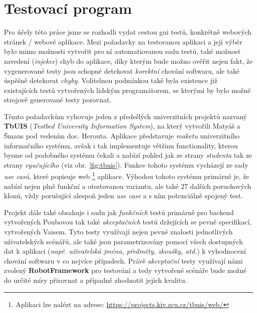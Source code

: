 \documentclass[czech, ma, kiv, he, iso690alph, pdf, viewonly]{fasthesis}
\begin{document}
    \section{Testovací program} \label{sec:test_program}

    Pro účely této práce jsme se rozhodli vydat cestou \acrshort{gui} testů, konkrétně webových stránek / webové aplikace. Mezi požadavky na testovanou aplikaci a její výběr bylo mimo možnosti vytvořit pro ní automatiovanou sadu testů, také možnost zavedení (\emph{injekce}) chyb do aplikace, díky kterým bude možno ověřit nejen fakt, že vygenerované testy jsou schopné detekovat \textit{korektní} chování softwaru, ale také úspěšně detekovat \textit{chyby}. Volitelnou podmínkou také byla existence již existujících testů vytvořených lidským programátorem, se kterými by bylo možné strojově generované testy porovnat.
    
    Těmto požadavkům vyhovuje jeden z předešlých univerzitních projektů nazvaný \textbf{TbUIS} (\textit{Testbed University Information System}), na který vytvořili Matyáš a Šmaus pod vedením doc. Herouta. \cite{Matyas2018} \cite{Smaus2019} Aplikace představuje \textit{maketu} univerzitního informačního systému, avšak i tak implementuje většinu functionality, kterou bysme od podobného systému čekali a nabízí pohled jak ze strany \textit{studenta} tak ze strany \textit{vyučujícího} (viz obr. \ref{fig:tbuis}). Funkce tohoto systému vycházejí ze sady \textit{use casů}, které popisuje web \footnote{Aplikaci lze nalézt na adrese: \url{https://projects.kiv.zcu.cz/tbuis/web/}} aplikace. Výhodou tohoto systému primárně je, že nabízí nejen plně funkční a otestovanou variantu, ale také \(27\) dalších poruchových klonů, vždy porušující alespoň jeden \textit{use case} a s ním potenciálně spojený test.

    Projekt dále také obsahuje i sadu jak \textit{funkčních} testů primárně pro backend vytvořených Poubovou tak také \textit{akceptačních} testů držejících se pevně specifikací, vytvořených Vaisem. \cite{Poubova2019} \cite{Vais2020} Tyto testy využívají nejen pevné znalosti jednotlivých uživatelských scénářů, ale také jsou parametrizovány pomocí všech dostupných dat k aplikaci (\textit{např. uživatelská jména, předměty, zkoušky, atd.}) k vyhodnocení chování softwaru v co nejvíce případech. Právě \textit{akceptační} testy využívají námi zvolený \textbf{RobotFramework} pro testování a tedy vytvořené scénáře bude možné do určité míry přirovnat a případně zhodnotit jejich kvalitu. 
\end{document}
